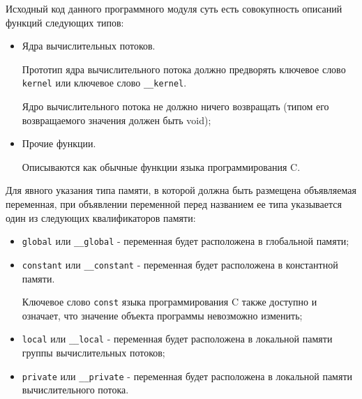 

		Исходный код данного программного модуля суть есть совокупность описаний функций следующих типов:

		\begin{itemize}

			\item Ядра вычислительных потоков.

				Прототип ядра вычислительного потока должно предворять ключевое слово \verb|kernel| или ключевое слово \verb|__kernel|.

				Ядро вычислительного потока не должно ничего возвращать (типом его возвращаемого значения должен быть void);

			\item Прочие функции.

				Описываются как обычные функции языка программирования C.

		\end{itemize}


		Для явного указания типа памяти, в которой должна быть размещена объявляемая переменная, при объявлении переменной перед названием ее типа указывается один из следующих квалификаторов памяти:

		\begin{itemize}

			\item \verb|global| или \verb|__global| - переменная будет расположена в глобальной памяти;
			\item \verb|constant| или \verb|__constant| - переменная будет расположена в константной памяти.

			Ключевое слово \verb|const| языка программирования C также доступно и означает, что значение объекта программы невозможно изменить;

			\item \verb|local| или \verb|__local| - переменная будет расположена в локальной памяти группы вычислительных потоков;
			\item \verb|private| или \verb|__private| - переменная будет расположена в локальной памяти вычислительного потока.

		\end{itemize}

